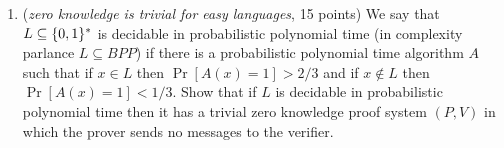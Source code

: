 \documentclass{article}
\begin{document}
\begin{enumerate}[,start=3]%

\item{}
(\emph{zero knowledge is trivial for easy languages}, 15 points) We say that $L\subseteq \{0,1\}^*$ is decidable in probabilistic polynomial time (in complexity parlance $L\subseteq BPP$) if there is a probabilistic polynomial time algorithm $A$  such that  if $x\in L$ then $\Pr[A(x)=1]>2/3$ and if $x\not\in L$ then $\Pr[A(x)=1]<1/3$. Show that if $L$ is decidable in probabilistic polynomial time then it has a trivial zero knowledge proof system $(P,V)$ in which the prover sends no messages to the verifier.%


\end{enumerate}
\end{document}
